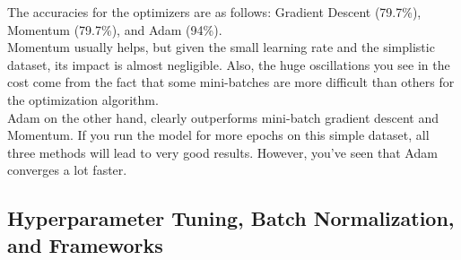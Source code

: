 \documentclass[11pt, a4paper]{article}
\begin{document}
\begin{spacing}{1.1}
\begin{center}
	\end{center}
	The accuracies for the optimizers are as follows: Gradient Descent (79.7\%), Momentum (79.7\%), and Adam (94\%). \vspace*{1mm} \\
	Momentum usually helps, but given the small learning rate and the simplistic dataset, its impact is almost negligible. Also, the huge oscillations you see in the cost come from the fact that some mini-batches are more difficult than others for the optimization algorithm. \vspace*{1mm} \\
	Adam on the other hand, clearly outperforms mini-batch gradient descent and Momentum. If you run the model for more epochs on this simple dataset, all three methods will lead to very good results. However, you've seen that Adam converges a lot faster. \newpage

	\subsection{Hyperparameter Tuning, Batch Normalization, and Frameworks}

\end{spacing}
\end{document}

